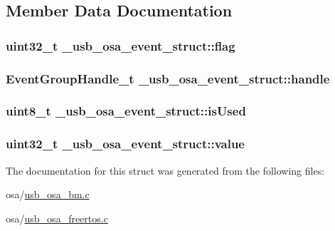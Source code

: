 \subsection{Member Data Documentation}
\hypertarget{struct__usb__osa__event__struct_aaedaee45e96d8308e345703a13e28814}{
\subsubsection[{flag}]{\setlength{\rightskip}{0pt plus 5cm}uint32\-\_\-t \-\_\-usb\-\_\-osa\-\_\-event\-\_\-struct\-::flag}}\label{struct__usb__osa__event__struct_aaedaee45e96d8308e345703a13e28814}
\hypertarget{struct__usb__osa__event__struct_aeb4dc367003aec9f7a6e20f9f295b33b}{
\subsubsection[{handle}]{\setlength{\rightskip}{0pt plus 5cm}Event\-Group\-Handle\-\_\-t \-\_\-usb\-\_\-osa\-\_\-event\-\_\-struct\-::handle}}\label{struct__usb__osa__event__struct_aeb4dc367003aec9f7a6e20f9f295b33b}
\hypertarget{struct__usb__osa__event__struct_aa5b019861b02ab2e02240d564cf8f5a0}{
\subsubsection[{is\-Used}]{\setlength{\rightskip}{0pt plus 5cm}uint8\-\_\-t \-\_\-usb\-\_\-osa\-\_\-event\-\_\-struct\-::is\-Used}}\label{struct__usb__osa__event__struct_aa5b019861b02ab2e02240d564cf8f5a0}
\hypertarget{struct__usb__osa__event__struct_acad4db5b92af1808841439b32c5fcbca}{
\subsubsection[{value}]{\setlength{\rightskip}{0pt plus 5cm}uint32\-\_\-t \-\_\-usb\-\_\-osa\-\_\-event\-\_\-struct\-::value}}\label{struct__usb__osa__event__struct_acad4db5b92af1808841439b32c5fcbca}


The documentation for this struct was generated from the following files\-:\begin{DoxyCompactItemize}
\item 
osa/\hyperlink{usb__osa__bm_8c}{usb\-\_\-osa\-\_\-bm.\-c}\item 
osa/\hyperlink{usb__osa__freertos_8c}{usb\-\_\-osa\-\_\-freertos.\-c}\end{DoxyCompactItemize}

